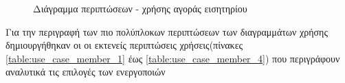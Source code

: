 \documentclass{assignment}
\begin{document}
\begin{figure}
\begin{center}
\caption{Διάγραμμα περιπτώσεων - χρήσης αγοράς εισητηρίου}
\label{fig:use_case_ticket}
\end{center}
\end{figure}

\newpage

Για την περιγραφή των πιο πολύπλοκων περιπτώσεων των διαγραμμάτων χρήσης δημιουργήθηκαν οι οι εκτενείς περιπτώσεις χρήσεις(πίνακες \ref{table:use_case_member_1} έως \ref{table:use_case_member_4}) που περιγράφουν αναλυτικά τις επιλογές των ενεργοποιών
\end{document}

